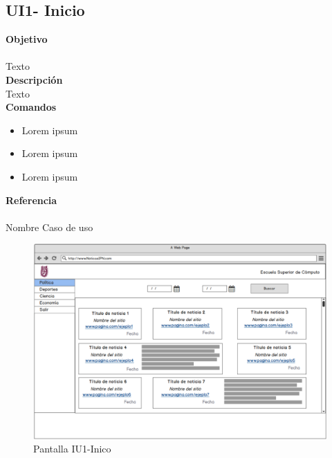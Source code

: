 \subsection{UI1- Inicio}

\Large{\textbf{Objetivo}}\\\\
\normalsize{Texto}\\

	

\Large{\textbf{Descripción}}\\
\normalsize{Texto}\\

\Large{\textbf{Comandos}}\\
\normalsize{}

\begin{itemize}
	\item Lorem ipsum
	\item Lorem ipsum
	\item Lorem ipsum
\end{itemize}


\Large{\textbf{Referencia}}\\\\
\normalsize{Nombre Caso de uso}

\begin{figure}
  \centering
	\includegraphics[scale=.3]{imagenes/Pantallas/UI1}
  \caption{Pantalla IU1-Inico}
  \label{fig:IU1}
\end{figure}
